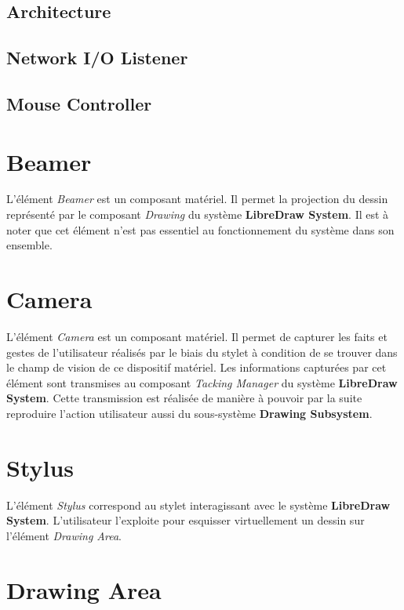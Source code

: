 \documentclass[11pt,a4paper,oldfontcommands]{memoir}
\begin{document}
\subsection{Architecture}

\subsection{Network I/O Listener}

\subsection{Mouse Controller}

\newpage

\section{Beamer}

L'élément \textit{Beamer} est un composant matériel. Il permet la projection du dessin représenté par le composant \textit{Drawing} du système \textbf{LibreDraw System}. Il est à noter que cet élément n'est pas essentiel au fonctionnement du système dans son ensemble.

\section{Camera}

L'élément \textit{Camera} est un composant matériel. Il permet de capturer les faits et gestes de l'utilisateur réalisés par le biais du stylet à condition de se trouver dans le champ de vision de ce dispositif matériel. Les informations capturées par cet élément sont transmises au composant \textit{Tacking Manager} du système \textbf{LibreDraw System}. Cette transmission est réalisée de manière à pouvoir par la suite reproduire l'action utilisateur aussi du sous-système \textbf{Drawing Subsystem}.

\section{Stylus}

L'élément \textit{Stylus} correspond au stylet interagissant avec le système \textbf{LibreDraw System}. L'utilisateur l'exploite pour esquisser virtuellement un dessin sur l'élément \textit{Drawing Area}.

\section{Drawing Area}
\end{document}
